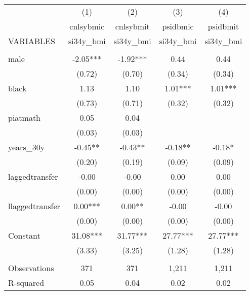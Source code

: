 \begin{tabular}{lcccc} \hline
 & (1) & (2) & (3) & (4) \\
 & cnlsybmic & cnlsybmit & psidbmic & psidbmit \\
VARIABLES & si34y\_bmi & si34y\_bmi & si34y\_bmi & si34y\_bmi \\ \hline
 &  &  &  &  \\
male & -2.05*** & -1.92*** & 0.44 & 0.44 \\
 & (0.72) & (0.70) & (0.34) & (0.34) \\
black & 1.13 & 1.10 & 1.01*** & 1.01*** \\
 & (0.73) & (0.71) & (0.32) & (0.32) \\
piatmath & 0.05 & 0.04 &  &  \\
 & (0.03) & (0.03) &  &  \\
years\_30y & -0.45** & -0.43** & -0.18** & -0.18* \\
 & (0.20) & (0.19) & (0.09) & (0.09) \\
laggedtransfer & -0.00 & -0.00 & 0.00 & 0.00 \\
 & (0.00) & (0.00) & (0.00) & (0.00) \\
llaggedtransfer & 0.00*** & 0.00** & -0.00 & -0.00 \\
 & (0.00) & (0.00) & (0.00) & (0.00) \\
Constant & 31.08*** & 31.77*** & 27.77*** & 27.77*** \\
 & (3.33) & (3.25) & (1.28) & (1.28) \\
 &  &  &  &  \\
Observations & 371 & 371 & 1,211 & 1,211 \\
 R-squared & 0.05 & 0.04 & 0.02 & 0.02 \\ \hline
\end{tabular}
